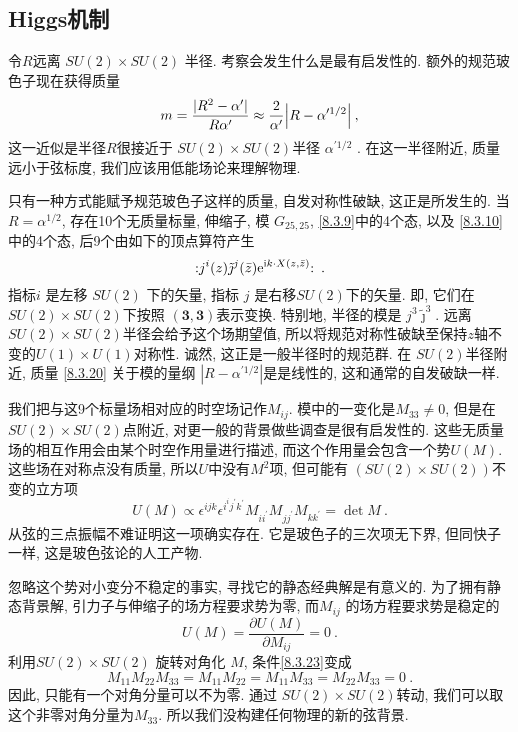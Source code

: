 \subsection*{Higgs机制}
令$R$远离 $S U(2) \times S U(2)$ 半径. 考察会发生什么是最有启发性的. 额外的规范玻色子现在获得质量
\begin{equation}
	m=\frac{|R^{2}-\alpha^{\prime}|}{R \alpha^{\prime}} \approx \frac{2}{\alpha^{\prime}}\Bigl|R-\alpha^{\prime 1 / 2}\Bigr| \:, 
	\label{8.3.20}
\end{equation}
这一近似是半径$R$很接近于 $S U(2) \times S U(2)$半径 $\alpha^{\prime 1 / 2}$ . 在这一半径附近, 质量远小于弦标度, 我们应该用低能场论来理解物理.

只有一种方式能赋予规范玻色子这样的质量, 自发对称性破缺, 这正是所发生的. 当 $R=\alpha^{1 / 2}$, 存在10个无质量标量, 伸缩子, 模 $G_{25,25}$, 
\eqref{8.3.9}中的4个态, 以及 \eqref{8.3.10}中的4个态, 后9个由如下的顶点算符产生
\begin{equation}
	: \mathrel{j^{i}(z) \tilde{\jmath}^{j}(\bar{z}) \mathrm{e}^{\mathrm{i} k \cdot X(z, \bar{z})}}: \:. \label{8.3.21}
\end{equation}
指标$i$ 是左移 $SU(2)$ 下的矢量, 指标 $j$ 是右移$SU(2)$下的矢量. 即, 它们在$S U(2) \times S U(2) $下按照 $(\bm{3},\bm{3})$表示变换. 
特别地, 半径的模是 $j^{3} \tilde{\jmath}^{3}$. 远离 $S U(2) \times S U(2)$半径会给予这个场期望值, 
所以将规范对称性破缺至保持$z$轴不变的$U(1) \times U(1)$对称性. 诚然, 这正是一般半径时的规范群. 在 $SU(2)$半径附近, 
质量 \eqref{8.3.20} 关于模的量纲 $|R-\alpha^{\prime 1 / 2}|$是是线性的, 这和通常的自发破缺一样. 

我们把与这9个标量场相对应的时空场记作$M_{i j} $. 模中的一变化是$M_{33} \neq 0$, 但是在 $S U(2) \times S U(2)$点附近, 对更一般的背景做些调查是很有启发性的. 这些无质量场的相互作用会由某个时空作用量进行描述, 而这个作用量会包含一个势$U(M)$. 这些场在对称点没有质量, 所以$U$中没有$M^{2}$项, 
但可能有 $(S U(2) \times S U(2))$不变的立方项
\begin{equation}
	U(M) \propto \epsilon^{i j k} \epsilon^{i^{i} j^{\prime} k^{\prime}} M_{i i^{\prime}} M_{j j^{\prime}} M_{k k^{\prime}}=\operatorname{det} M \:. \label{8.3.22}
\end{equation}
从弦的三点振幅不难证明这一项确实存在. 它是玻色子的三次项无下界, 但同快子一样, 这是玻色弦论的人工产物.

忽略这个势对小变分不稳定的事实, 寻找它的静态经典解是有意义的. 为了拥有静态背景解, 引力子与伸缩子的场方程要求势为零, 而$M_{i j}$ 的场方程要求势是稳定的
\begin{equation}
	U(M)=\frac{\partial U(M)}{\partial M_{i j}}=0 \:. \label{8.3.23}
\end{equation}
利用$S U(2) \times S U(2)$ 旋转对角化 $M$, 条件\eqref{8.3.23}变成
\begin{equation}
	M_{11} M_{22} M_{33}=M_{11} M_{22}=M_{11} M_{33}=M_{22} M_{33}=0 \:. \label{8.3.24}
\end{equation}
因此, 只能有一个对角分量可以不为零. 通过 $S U(2) \times S U(2)$转动, 我们可以取这个非零对角分量为$M_{33} $. 所以我们没构建任何物理的新的弦背景.

